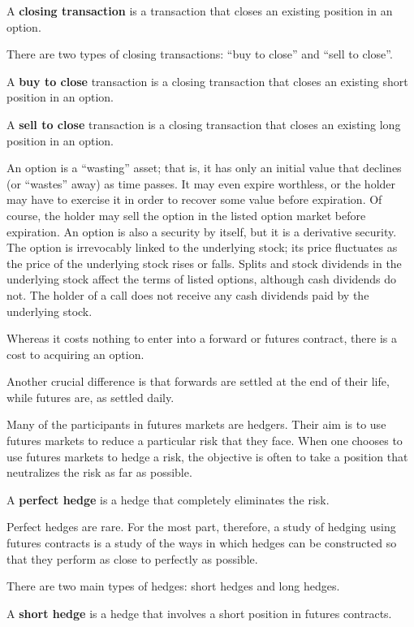 A \textbf{closing transaction} is a transaction that closes an existing position in an option.
\ed

There are two types of closing transactions: ``buy to close'' and ``sell to close''.

A \textbf{buy to close} transaction is a closing transaction that closes an existing short position in an option.
\ed

A \textbf{sell to close} transaction is a closing transaction that closes an existing long position in an option.
\ed

An option is a ``wasting'' asset; that is, it has only an initial value that declines (or ``wastes'' away) as time
passes. It may even expire worthless, or the holder may have to exercise it in order to recover some value before
expiration. Of course, the holder may sell the option in the listed option market before expiration. An option is
also a security by itself, but it is a derivative security. The option is irrevocably linked to the underlying
stock; its price fluctuates as the price of the underlying stock rises or falls. Splits and stock dividends in the
underlying stock affect the terms of listed options, although cash dividends do not. The holder of a call does not
receive any cash dividends paid by the underlying stock.

Whereas it costs nothing to enter into a forward or futures contract, there is a cost to acquiring an option.

Another crucial difference is that forwards are settled at the end of their life, while futures are, as settled daily.

Many of the participants in futures markets are hedgers. Their aim is to use futures markets to reduce a particular
risk that they face. When one chooses to use futures markets to hedge a risk, the objective is often to take a
position that neutralizes the risk as far as possible.

A \textbf{perfect hedge} is a hedge that completely eliminates the risk.
\ed

Perfect hedges are rare. For the most part, therefore, a study of hedging using futures contracts is a study of the
ways in which hedges can be constructed so that they perform as close to perfectly as possible.

There are two main types of hedges: short hedges and long hedges.

A \textbf{short hedge} is a hedge that involves a short position in futures contracts.
\ed

